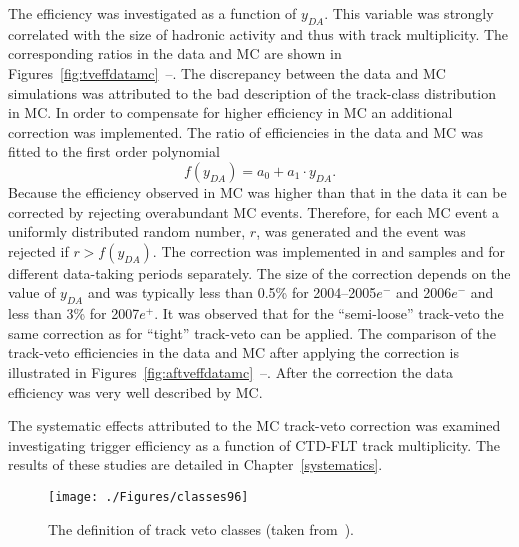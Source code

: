 The efficiency was investigated as a function of $y_{DA}$. This variable was strongly correlated with the size of hadronic activity and thus with track multiplicity. The corresponding ratios in the data and MC are shown in Figures~\ref{fig:tveffdatamc}~--. The discrepancy between the data and MC simulations was attributed to the bad description of the track-class distribution in MC. In order to compensate for higher efficiency in MC an additional correction was implemented. The ratio of efficiencies in the data and MC was fitted to the first order polynomial
\begin{equation} 
 f\left(y_{DA}\right)=a_0 + a_1 \cdot y_{DA}.
\end{equation}
Because the efficiency observed in MC was higher than that in the data it can be corrected by rejecting overabundant MC events. Therefore, for each MC event a uniformly distributed random number, $r$, was generated and the event was rejected if $r > f\left(y_{DA}\right)$. The correction was implemented in \lepto and \ariadne samples and for different data-taking periods separately. The size of the correction depends on the value of $y_{DA}$ and was typically less than 0.5\% for 2004--2005$e^-$ and 2006$e^-$ and less than 3\% for 2007$e^+$. It was observed that for the ``semi-loose'' track-veto the same correction as for ``tight'' track-veto can be applied. The comparison of the track-veto efficiencies in the data and MC after applying the correction is illustrated in Figures~\ref{fig:aftveffdatamc}~--. After the correction the data efficiency was very well described by MC. 

The systematic effects attributed to the MC track-veto correction was examined investigating trigger efficiency as a function of CTD-FLT track multiplicity. The results of these studies are detailed in Chapter~\ref{systematics}.
\begin{figure}[t]
  \begin{center}
    \texttt{[image: ./Figures/classes96]}
  \end{center}
  \caption{The definition of track veto classes (taken from~\protect\cite{Yamazaki site}).}
  \label{fig:trackvetodefinition}
\end{figure}


